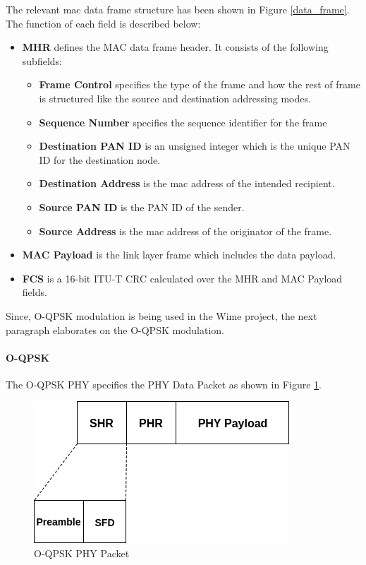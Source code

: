 The relevant \ac{mac} data frame structure has been shown in Figure \ref{data_frame}.
The function of each field is described below:
\begin{itemize}
\item{\textbf{MHR} defines the MAC data frame header. It consists of the following subfields:
\begin{itemize}
\item{\textbf{Frame Control} specifies the type of the frame and how the rest of frame is structured like the source and destination addressing modes.}
\item{\textbf{Sequence Number} specifies the sequence identifier for the frame}
\item{\textbf{Destination PAN ID} is an unsigned integer which is the unique \ac{PAN} ID for the destination node.}
\item{\textbf{Destination Address} is the \ac{mac} address of the intended recipient.}
\item{\textbf{Source PAN ID} is the \ac{PAN} ID of the sender.}
\item{ \textbf{Source Address} is the \ac{mac} address of the originator of the frame.} 
\end{itemize}}
\item{\textbf{MAC Payload} is the link layer frame which includes the data payload. }
\item{\textbf{\ac{FCS}} is a 16-bit ITU-T \ac{CRC} calculated over the MHR and MAC Payload fields.} 
\end{itemize}


Since, \ac{O-QPSK} modulation is being used in the Wime project, the next paragraph elaborates on the \ac{O-QPSK} modulation.

\paragraph{\ac{O-QPSK}}

The O-QPSK PHY specifies the PHY Data Packet as shown in Figure \ref{OQPSK_packet}.

\begin{figure}[h!]
\centering
\includegraphics[scale=0.6]{Figure/OQPSK.png}
\caption{O-QPSK PHY Packet}
\label{OQPSK_packet}
\end{figure}

